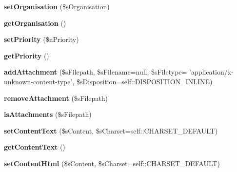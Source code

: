 \begin{DoxyCompactItemize}
\item 
\hypertarget{class_mail_acf7f186242daee36e06c4f7b3fa42b96}{{\bfseries set\-Organisation} (\$s\-Organisation)}\label{class_mail_acf7f186242daee36e06c4f7b3fa42b96}

\item 
\hypertarget{class_mail_a41e8eabd9d45ce9a1afc2b3554754fcf}{{\bfseries get\-Organisation} ()}\label{class_mail_a41e8eabd9d45ce9a1afc2b3554754fcf}

\item 
\hypertarget{class_mail_a823401a92c9e315e20baa04752845dbd}{{\bfseries set\-Priority} (\$n\-Priority)}\label{class_mail_a823401a92c9e315e20baa04752845dbd}

\item 
\hypertarget{class_mail_a815998e3c1fc2def35097a482a7380ce}{{\bfseries get\-Priority} ()}\label{class_mail_a815998e3c1fc2def35097a482a7380ce}

\item 
\hypertarget{class_mail_a23f02ddb655c9811230ac5a327af7cb3}{{\bfseries add\-Attachment} (\$s\-Filepath, \$s\-Filename=null, \$s\-Filetype= 'application/x-\/unknown-\/content-\/type', \$s\-Disposition=self\-::\-D\-I\-S\-P\-O\-S\-I\-T\-I\-O\-N\-\_\-\-I\-N\-L\-I\-N\-E)}\label{class_mail_a23f02ddb655c9811230ac5a327af7cb3}

\item 
\hypertarget{class_mail_a5947702f6345020ebe2d8070de3b3d4f}{{\bfseries remove\-Attachment} (\$s\-Filepath)}\label{class_mail_a5947702f6345020ebe2d8070de3b3d4f}

\item 
\hypertarget{class_mail_ad171a48cf2be61991141abf42872a67f}{{\bfseries is\-Attachments} (\$s\-Filepath)}\label{class_mail_ad171a48cf2be61991141abf42872a67f}

\item 
\hypertarget{class_mail_a54527d22a15d657565d1c2b0d28f244c}{{\bfseries set\-Content\-Text} (\$s\-Content, \$s\-Charset=self\-::\-C\-H\-A\-R\-S\-E\-T\-\_\-\-D\-E\-F\-A\-U\-L\-T)}\label{class_mail_a54527d22a15d657565d1c2b0d28f244c}

\item 
\hypertarget{class_mail_ac6f12254651134cf12c9c3ce6f88836b}{{\bfseries get\-Content\-Text} ()}\label{class_mail_ac6f12254651134cf12c9c3ce6f88836b}

\item 
\hypertarget{class_mail_a43f2221c02dc4066179f56e32ea750dd}{{\bfseries set\-Content\-Html} (\$s\-Content, \$s\-Charset=self\-::\-C\-H\-A\-R\-S\-E\-T\-\_\-\-D\-E\-F\-A\-U\-L\-T)}\label{class_mail_a43f2221c02dc4066179f56e32ea750dd}


\end{DoxyCompactItemize}
